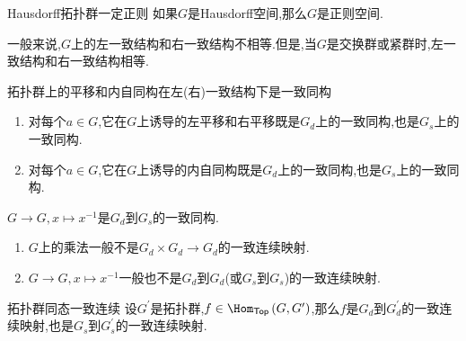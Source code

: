 \begin{corollary}{Hausdorff拓扑群一定正则}{}
	如果$G$是Hausdorff空间,那么$G$是正则空间.
\end{corollary}

\begin{remark}{}{}
	一般来说,$G$上的左一致结构和右一致结构不相等.但是,当$G$是交换群或紧群时,左一致结构和右一致结构相等.
\end{remark}

\begin{proposition}{拓扑群上的平移和内自同构在左(右)一致结构下是一致同构}{}
	\begin{enumerate}
		\item 对每个$a\in G$,它在$G$上诱导的左平移和右平移既是$G_{d}$上的一致同构,也是$G_{s}$上的一致同构.
		\item 对每个$a\in G$,它在$G$上诱导的内自同构既是$G_{d}$上的一致同构,也是$G_{s}$上的一致同构.
	\end{enumerate}
\end{proposition}

\begin{proposition}{}{}
	$G\to G,x\mapsto x^{-1}$是$G_{d}$到$G_{s}$的一致同构.
\end{proposition}

\begin{remark}{}{}
	\begin{enumerate}
		\item $G$上的乘法一般不是$G_{d}\times G_{d}\to G_{d}$的一致连续映射.
		\item $G\to G,x\mapsto x^{-1}$一般也不是$G_{d}$到$G_{d}$(或$G_{s}$到$G_{s}$)的一致连续映射.
	\end{enumerate}
\end{remark}

\begin{proposition}{拓扑群同态一致连续}{}
	设$G^{\prime}$是拓扑群,$f\in\Hom_{\mathsf{Top}}\left(G,G^{\prime}\right)$,那么$f$是$G_{d}$到$G_{d}^{\prime}$的一致连续映射,也是$G_{s}$到$G_{s}^{\prime}$的一致连续映射.
\end{proposition}

